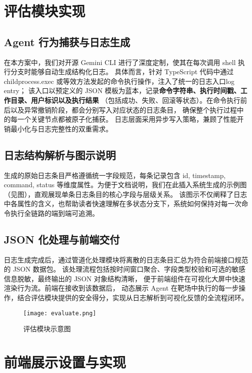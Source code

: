 \documentclass[lang=cn,10pt]{elegantbook}
\begin{document}
\section{评估模块实现}

\subsection{Agent 行为捕获与日志生成}
在本方案中，我们对开源 Gemini CLI 进行了深度定制，使其在每次调用 shell 执行分支时能够自动生成结构化日志。
具体而言，针对 TypeScript 代码中通过 childprocess.exec 或等效方法发起的命令执行操作，注入了统一的日志入口log entry；
该入口以预定义的 JSON 模板为蓝本，记录\textbf{命令字符串、执行时间戳、工作目录、用户标识以及执行结果}
（包括成功、失败、回滚等状态）。在命令执行前后以及异常撤销阶段，都会分别写入对应状态的日志条目，
确保整个执行过程中的每一个关键节点都被原子化捕获。
日志层面采用异步写入策略，兼顾了性能开销最小化与日志完整性的双重需求。

\subsection{日志结构解析与图示说明}
生成的原始日志条目严格遵循统一字段规范，每条记录包含 id, timestamp, command, status
等维度属性。为便于文档说明，我们在此插入系统生成的示例图（见图），直观展现单条日志条目的核心字段与层级关系。
该图示不仅阐释了日志中各属性的含义，也帮助读者快速理解在多状态分支下，系统如何保持对每一次命令执行全链路的端到端可追溯。

\subsection{JSON 化处理与前端交付}
日志生成完成后，通过管道化处理模块将离散的日志条目汇总为符合前端接口规范的 JSON 数据包。
该处理流程包括按时间窗口聚合、字段类型校验和可选的敏感信息脱敏，最终输出的 JSON 对象结构清晰，
便于前端组件在可视化大屏中快速渲染行为流。前端在接收到该数据后，
动态展示 Agent 在靶场中执行的每一步操作，结合评估模块提供的安全得分，实现从日志解析到可视化反馈的全流程闭环。

\begin{figure}[htbp]
\centering
\texttt{[image: evaluate.png]}  %
\caption{评估模块示意图}  %
\label{fig:evaluate}  %
\end{figure}

\section{前端展示设置与实现}
\end{document}
